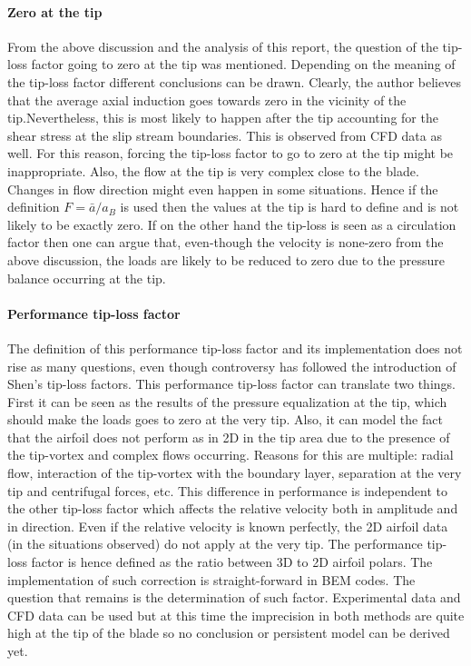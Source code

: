 \documentclass[a4paper,11pt]{book}
\begin{document}
\paragraph{Zero at the tip} From the above discussion and the analysis of this report, the question of the tip-loss factor going to zero at the tip was mentioned. Depending on the meaning of the tip-loss factor different conclusions can be drawn. Clearly, the author believes that the average axial induction goes towards zero in the vicinity of the tip.Nevertheless, this is most likely to happen after the tip accounting for the shear stress at the slip stream boundaries. This is observed from CFD data as well. For this reason, forcing the tip-loss factor to go to zero at the tip might be inappropriate. Also, the flow at the tip is very complex close to the blade. Changes in flow direction might even happen in some situations. Hence if the definition $F=\bar{a}/a_B$ is used then the values at the tip is hard to define and is not likely to be exactly zero. If on the other hand the tip-loss is seen as a circulation factor then one can argue that, even-though the velocity is none-zero from the above discussion, the loads are likely to be reduced to zero due to the pressure balance occurring at the tip.


\paragraph{Performance tip-loss factor} The definition of this performance tip-loss factor and its implementation does not rise as many questions, even though controversy has followed the introduction of Shen's tip-loss factors. This performance tip-loss factor can translate two things. First it can be seen as the results of the pressure equalization at the tip, which should make the loads goes to zero at the very tip. Also, it can model the fact that the airfoil does not perform as in 2D in the tip area due to the presence of the tip-vortex and complex flows occurring. Reasons for this are multiple: radial flow, interaction of the tip-vortex with the boundary layer, separation at the very tip and centrifugal forces, etc. This difference in performance is independent to the other tip-loss factor which affects the relative velocity both in amplitude and in direction. Even if the relative velocity is known perfectly, the 2D airfoil data (in the situations observed) do not apply at the very tip. The performance tip-loss factor is hence defined as the ratio between 3D to 2D airfoil polars. The implementation of such correction is straight-forward in BEM codes. The question that remains is the determination of such factor. Experimental data and CFD data can be used but at this time the imprecision in both methods are quite high at the tip of the blade so no conclusion or persistent model can be derived yet. 
\end{document}
